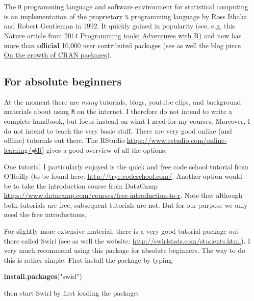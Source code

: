 \documentclass[]{article}
\newenvironment{Shaded}{\begin{snugshade}}{\end{snugshade}}
\newcommand{\KeywordTok}[1]{\textcolor[rgb]{0.13,0.29,0.53}{\textbf{#1}}}
\newcommand{\StringTok}[1]{\textcolor[rgb]{0.31,0.60,0.02}{#1}}
\newcommand{\NormalTok}[1]{#1}
\theoremstyle{definition}
\theoremstyle{definition}
\theoremstyle{definition}
\theoremstyle{remark}
\begin{document}
The \texttt{R} programming language and software environment for
statistical computing is an implementation of the proprietary \texttt{S}
programming language by Ross Ithaka and Robert Gentleman in 1992. It
quickly gained in popularity (see, e.g, this Nature article from 2014
\href{http://www.nature.com/news/programming-tools-adventures-with-r-1.16609}{Programming
tools: Adventures with R}) and now has more than \textbf{official}
10,000 user contributed packages (see as well the blog piece
\href{https://www.r-bloggers.com/on-the-growth-of-cran-packages/}{On the
growth of CRAN packages}).

\subsection{For absolute beginners}\label{for-absolute-beginners}

At the moment there are \emph{many} tutorials, blogs, youtube clips, and
background materials about using \texttt{R} on the internet. I therefore
do not intend to write a complete handbook, but focus instead on what I
need for my courses. Moreover, I do not intend to teach the very basic
stuff. There are very good online (and offline) tutorials out there. The
RStudio \url{https://www.rstudio.com/online-learning/\#R}{]} gives a
good overview of all the options.

One tutorial I particularly enjoyed is the quick and free code school
tutorial from O'Reilly (to be found here:
\url{http://tryr.codeschool.com/}. Another option would be to take the
introduction course from DataCamp
\url{https://www.datacamp.com/courses/free-introduction-to-r}. Note that
although both tutorials are free, subsequent tutorials are not. But for
our purpose we only need the free introductions.

For slightly more extensive material, there is a very good tutorial
package out there called Swirl (see as well the website:
\url{http://swirlstats.com/students.html}). I very much recommend using
this package for absolute beginners. The way to do this is rather
simple. First install the package by typing:

\begin{Shaded}
\begin{Highlighting}[]
\KeywordTok{install.packages}\NormalTok{(}\StringTok{"swirl"}\NormalTok{)}
\end{Highlighting}
\end{Shaded}

then start Swirl by first loading the package:
\end{document}
